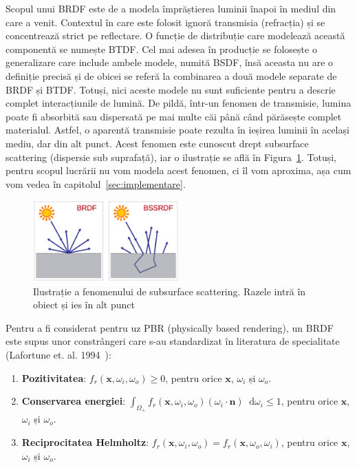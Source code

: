 \documentclass[12pt,a4paper]{report}
\newcommand*\diff{\mathop{}\!\mathrm{d}}
\numberwithin{equation}{section} %
\begin{document}
Scopul unui BRDF este de a modela împrăștierea luminii înapoi în mediul din care a venit.
Contextul în care este folosit ignoră transmisia (refracția) și se concentrează strict
pe reflectare. O funcție de distribuție care modelează această componentă se numește
BTDF. Cel mai adesea în producție se folosește o generalizare care include ambele
modele, numită BSDF, însă aceasta nu are o definiție precisă și de obicei se referă
la combinarea a două modele separate de BRDF și BTDF. Totuși, nici aceste modele nu sunt
suficiente pentru a descrie complet interacțiunile de lumină. De pildă, într-un fenomen
de transmisie, lumina poate fi absorbită sau dispersată pe mai multe căi până când
părăsește complet materialul. Astfel, o aparentă transmisie poate rezulta în ieșirea
luminii în același mediu, dar din alt punct. Acest fenomen este cunoscut drept
subsurface scattering (dispersie sub suprafață), iar o ilustrație se află în Figura~\ref{fig:sss}.
Totuși, pentru scopul lucrării nu vom modela acest fenomen, ci îl vom aproxima,
așa cum vom vedea în capitolul~\ref{sec:implementare}.

\begin{figure}[ht]
	\centering
	\includegraphics[width=0.5\textwidth]{pics/bssrdf.png}
	\caption{Ilustrație a fenomenului de subsurface scattering. Razele intră în obiect și ies în alt punct\protect{}}
	\label{fig:sss}
\end{figure}

Pentru a fi considerat pentru uz PBR (physically based rendering), un BRDF
este supus unor constrângeri care s-au standardizat în literatura de specialitate
(Lafortune et. al. 1994~\cite{Lafortune}):

\begin{enumerate}
	\item \textbf{Pozitivitatea}: $f_r(\mathbf{x}, \omega_i, \omega_o) \geq 0$, pentru orice $\mathbf{x}$, $\omega_i$ și $\omega_o$.
	\item \textbf{Conservarea energiei}: $\int_{\Omega_+} f_r(\mathbf{x}, \omega_i, \omega_o) (\omega_i \cdot \mathbf{n}) \diff \omega_i \leq 1$, pentru orice $\mathbf{x}$, $\omega_i$ și $\omega_o$.
	\item \textbf{Reciprocitatea Helmholtz}: $f_r(\mathbf{x}, \omega_i, \omega_o) = f_r(\mathbf{x}, \omega_o, \omega_i)$, pentru orice $\mathbf{x}$, $\omega_i$ și $\omega_o$.
\end{enumerate}
\end{document}
